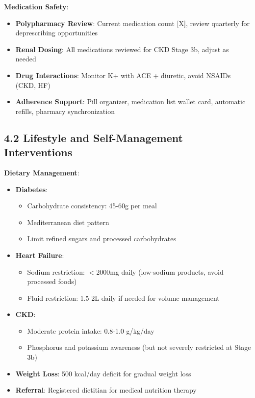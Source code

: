 \documentclass[11pt,letterpaper]{article}
\begin{document}
\textbf{Medication Safety}:
\begin{itemize}[leftmargin=*]
    \item \textbf{Polypharmacy Review}: Current medication count [X], review quarterly for deprescribing opportunities
    \item \textbf{Renal Dosing}: All medications reviewed for CKD Stage 3b, adjust as needed
    \item \textbf{Drug Interactions}: Monitor K+ with ACE + diuretic, avoid NSAIDs (CKD, HF)
    \item \textbf{Adherence Support}: Pill organizer, medication list wallet card, automatic refills, pharmacy synchronization
\end{itemize}

\subsection*{4.2 Lifestyle and Self-Management Interventions}

\textbf{Dietary Management}:
\begin{itemize}[leftmargin=*]
    \item \textbf{Diabetes}:
    \begin{itemize}
        \item Carbohydrate consistency: 45-60g per meal
        \item Mediterranean diet pattern
        \item Limit refined sugars and processed carbohydrates
    \end{itemize}
    \item \textbf{Heart Failure}:
    \begin{itemize}
        \item Sodium restriction: $<$2000mg daily (low-sodium products, avoid processed foods)
        \item Fluid restriction: 1.5-2L daily if needed for volume management
    \end{itemize}
    \item \textbf{CKD}:
    \begin{itemize}
        \item Moderate protein intake: 0.8-1.0 g/kg/day
        \item Phosphorus and potassium awareness (but not severely restricted at Stage 3b)
    \end{itemize}
    \item \textbf{Weight Loss}: 500 kcal/day deficit for gradual weight loss
    \item \textbf{Referral}: Registered dietitian for medical nutrition therapy
\end{itemize}
\end{document}
